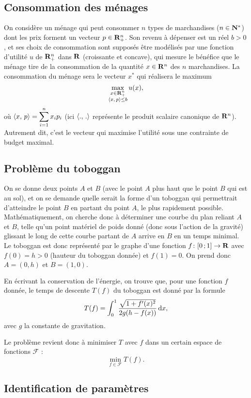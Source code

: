 \documentclass[grape]{../ceri/sty/MasterNotes}
\begin{document}
\subsection{Consommation des ménages}

On considère un ménage qui peut consommer $n$ types de marchandises ($n\in\mathbf{N}^*$) dont les prix forment un vecteur $p\in\mathbf{R}_+^n$. Son revenu à dépenser est un réel $b>0$, et ses choix de consommation sont supposés être modélisés par une fonction d'utilité $u$ de $\mathbf{R}_+^n$ dans $\mathbf{R}$ (croissante et concave), qui mesure le bénéfice que le ménage tire de la consommation de la quantité $x\in\mathbf{R}^n$ des $n$ marchandises. La consommation du ménage sera le vecteur $x^*$ qui réalisera le maximum
\[ \max_{\substack{x\in\R_+^n\\\ps xp\le b}}u(x), \]
où $\ps xp=\displaystyle\sum_{i=1}^nx_ip_i$ (ici $\ps..$ représente le produit scalaire canonique de $\mathbf{R}^n$). Autrement dit, c'est le vecteur qui maximise l'utilité sous une contrainte de budget maximal.

\subsection{Problème du toboggan}

On se donne deux points $A$ et $B$ (avec le point $A$ plus haut que le point $B$ qui est au sol), et on se demande quelle serait la forme d'un toboggan qui permettrait d'atteindre le point $B$ en partant du point $A$, le plus rapidement possible. Mathématiquement, on cherche donc à déterminer une courbe du plan reliant $A$ et $B$, telle qu'un point matériel de poids donné (donc sous l'action de la gravité) glissant le long de cette courbe partant de $A$ arrive en $B$ en un temps minimal. Le toboggan est donc représenté par le graphe d'une fonction $f\colon\intff 01\to\R$ avec $f(0)=h>0$ (hauteur du toboggan donnée) et $f(1)=0$. On prend donc $A=(0,h)$ et $B=(1,0)$.

En écrivant la conservation de l'énergie, on trouve que, pour une fonction $f$ donnée, le temps de descente $T(f)$ du toboggan est donné par la formule
\[ T(f) = \int_0^1\frac{\sqrt{1+f'(x)^2}}{2g(h-f(x))}\mathop{}\mathopen{}\mathrm d x, \]
avec $g$ la constante de gravitation.

Le problème revient donc à minimiser $T$ avec $f$ dans un certain espace de fonctions $\mathcal F$ :
\[ \min_{f\in\mathcal F}T(f). \]

\subsection{Identification de paramètres}
\end{document}
